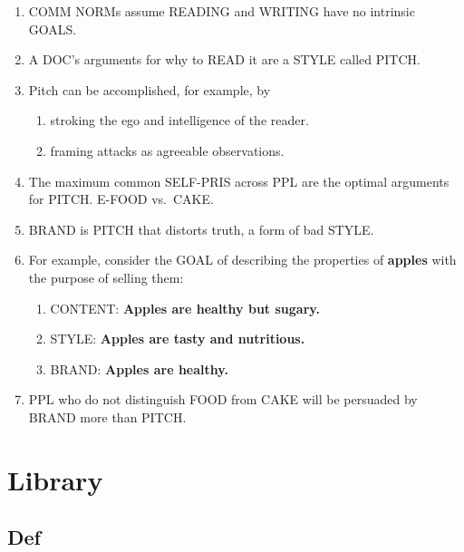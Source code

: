 \documentclass[
]{book}
\providecommand{\tightlist}{%
  \setlength{\itemsep}{0pt}\setlength{\parskip}{0pt}}
\begin{document}
\begin{enumerate}
\def\labelenumi{\arabic{enumi}.}
\setcounter{enumi}{63}
\tightlist
\item
  COMM NORMs assume READING and WRITING have no intrinsic GOALS.
\item
  A DOC's arguments for why to READ it are a STYLE called PITCH.
\item
  Pitch can be accomplished, for example, by

  \begin{enumerate}
  \def\labelenumii{\arabic{enumii}.}
  \tightlist
  \item
    stroking the ego and intelligence of the reader.
  \item
    framing attacks as agreeable observations.
  \end{enumerate}
\item
  The maximum common SELF-PRIS across PPL are the optimal
  arguments for PITCH. E-FOOD vs.~CAKE.
\item
  BRAND is PITCH that distorts truth, a form of bad STYLE.
\item
  For example, consider the GOAL of describing the properties of \textbf{apples } with the purpose of selling them:

  \begin{enumerate}
  \def\labelenumii{\arabic{enumii}.}
  \tightlist
  \item
    CONTENT: \textbf{Apples are healthy but sugary. }\\
  \item
    STYLE: \textbf{Apples are tasty and nutritious. }\\
  \item
    BRAND: \textbf{Apples are healthy.}\\
  \end{enumerate}
\item
  PPL who do not distinguish FOOD from CAKE will be persuaded by BRAND more than PITCH.
\end{enumerate}

\hypertarget{library}{%
\section{Library}\label{library}}

\hypertarget{def}{%
\subsection{Def}\label{def}}
\end{document}
